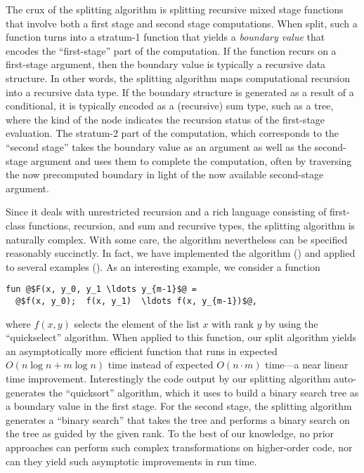 The crux of the splitting algorithm is splitting recursive mixed stage
functions that involve both a first stage and second stage
computations.  When split, such a function turns into a stratum-1
function that yields a {\em boundary value} that encodes the
``first-stage'' part of the computation.  If the function recurs on a
first-stage argument, then the boundary value is typically a recursive
data structure.  In other words, the splitting algorithm maps
computational recursion into a recursive data type. If the boundary
structure is generated as a result of a conditional, it is typically
encoded as a (recursive) sum type, such as a tree, where the kind of
the node indicates the recursion status of the first-stage evaluation.
The stratum-2 part of the computation, which corresponds to the
``second stage'' takes the boundary value as an argument as well as
the second-stage argument and uses them to complete the computation,
often by traversing the now precomputed boundary in light of the now
available second-stage argument.

Since it deals with unrestricted recursion and a rich language
consisting of first-class functions, recursion, and sum and recursive
types, the splitting algorithm is naturally complex. With some care,
the algorithm nevertheless can be specified reasonably succinctly.  In
fact, we have implemented the algorithm () and
applied to several examples ().  As an interesting
example, we consider a function
\begin{lstlisting}
fun @$F(x, y_0, y_1 \ldots y_{m-1}$@ = 
  @$f(x, y_0);  f(x, y_1)  \ldots f(x, y_{m-1})$@,
\end{lstlisting}
where $f(x,y)$ selects the element of the list $x$ with rank $y$ by
using the ``quickselect'' algorithm.  When applied to this function,
our split algorithm yields an asymptotically more efficient function
that runs in expected $O(n\log{n} + m\log{n})$ time instead of
expected $O(n \cdot m)$ time---a near linear time improvement.
Interestingly the code output by our splitting algorithm
auto-generates the ``quicksort'' algorithm, which it uses to build a
binary search tree as a boundary value in the first stage.  For the
second stage, the splitting algorithm generates a ``binary search''
that takes the tree and performs a binary search on the tree as guided
by the given rank.  To the best of our knowledge, no prior approaches
can perform such complex transformations on higher-order code, nor can
they yield such asymptotic improvements in run time.


